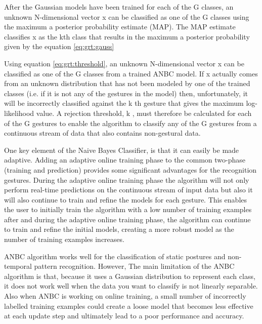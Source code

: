 

After the Gaussian models have been trained for each of the G classes, an unknown N-dimensional vector x can be classified as one of the G classes using the maximum a posterior probability estimate (MAP). The MAP estimate classifies x as the kth class that results in the maximum a posterior probability given by the equation \ref{eq:grt:gauss}



Using equation \ref{eq:grt:threshold}, an unknown N-dimensional vector x can be classified as one of the G classes from a trained ANBC model. If x actually comes from an unknown distribution that has not been modeled by one of the trained classes (i.e. if it is not any of the gestures in the model) then, unfortunately, it will be incorrectly classified against the k th gesture that gives the maximum log-likelihood value. A rejection threshold, k , must therefore be calculated for each of the G gestures to enable the algorithm to classify any of the G gestures from a continuous stream of data that also contains non-gestural data.

One key element of the Naive Bayes Classifier, is that it can easily be made adaptive. Adding an adaptive online training phase to the common two-phase (training and prediction) provides some significant advantages for the recognition gestures. During the adaptive online training phase the algorithm will not only perform real-time predictions on the continuous stream of input data but also it will also continue to train and refine the models for each gesture. This enables the user to initially train the algorithm with a low number of training examples after and during the adaptive online training phase, the algorithm can continue to train and refine the initial models, creating a more robust model as the number of training examples increases.

ANBC algorithm works well for the classification of static postures and non-temporal pattern recognition. However, The main limitation of the ANBC algorithm is that, because it uses a Gaussian distribution to represent each class, it does not work well when the data you want to classify is not linearly separable. Also when ANBC is working on online training, a small number of incorrectly labelled training examples could create a loose model that becomes less effective at each update step and ultimately lead to a poor performance and accuracy.

